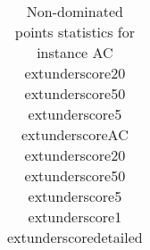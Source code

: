 \begin{table}
\caption{Non-dominated points statistics for instance AC	extunderscore20	extunderscore50	extunderscore5	extunderscoreAC	extunderscore20	extunderscore50	extunderscore5	extunderscore1	extunderscoredetailed}
\label{tab:stats/AC_20_50_5_AC_20_50_5_1_detailed}
\begin{tabular}{}
\toprule
\midrule
\bottomrule
\end{tabular}
\end{table}
